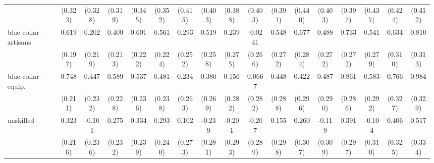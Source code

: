 {\begin{tabular}{l*{16}{c}}
                    &     (0.323)         &     (0.328)         &     (0.319)         &     (0.345)         &     (0.352)         &     (0.415)         &     (0.403)         &     (0.388)         &     (0.403)         &     (0.391)         &     (0.440)         &     (0.403)         &     (0.397)         &     (0.437)         &     (0.424)         &     (0.412)         \\
[1em]
blue collar - artisans&       0.619\sym{**} &       0.202         &       0.400         &       0.601\sym{**} &       0.561\sym{*}  &       0.293         &       0.519\sym{*}  &       0.239         &     -0.0241         &       0.548\sym{*}  &       0.677\sym{*}  &       0.488         &       0.733\sym{**} &       0.541         &       0.634\sym{*}  &       0.810\sym{**} \\
                    &     (0.197)         &     (0.219)         &     (0.213)         &     (0.222)         &     (0.224)         &     (0.252)         &     (0.258)         &     (0.275)         &     (0.266)         &     (0.272)         &     (0.284)         &     (0.272)         &     (0.272)         &     (0.279)         &     (0.310)         &     (0.313)         \\
[1em]
blue collar - equip.&       0.748\sym{***}&       0.447         &       0.589\sym{**} &       0.537\sym{*}  &       0.481\sym{*}  &       0.234         &       0.380         &       0.156         &      0.0667         &       0.448         &       0.422         &       0.487         &       0.861\sym{**} &       0.583\sym{*}  &       0.766\sym{*}  &       0.984\sym{**} \\
                    &     (0.211)         &     (0.232)         &     (0.228)         &     (0.236)         &     (0.238)         &     (0.263)         &     (0.269)         &     (0.282)         &     (0.282)         &     (0.288)         &     (0.296)         &     (0.290)         &     (0.286)         &     (0.292)         &     (0.327)         &     (0.329)         \\
[1em]
unskilled           &       0.323         &      -0.101         &       0.275         &       0.334         &       0.293         &       0.102         &      -0.239         &      -0.201         &      -0.207         &       0.155         &       0.260         &      -0.119         &       0.391         &      -0.104         &       0.406         &       0.517         \\
                    &     (0.216)         &     (0.236)         &     (0.232)         &     (0.239)         &     (0.240)         &     (0.273)         &     (0.281)         &     (0.293)         &     (0.289)         &     (0.298)         &     (0.307)         &     (0.309)         &     (0.297)         &     (0.310)         &     (0.325)         &     (0.334)         \\

\end{tabular}}

